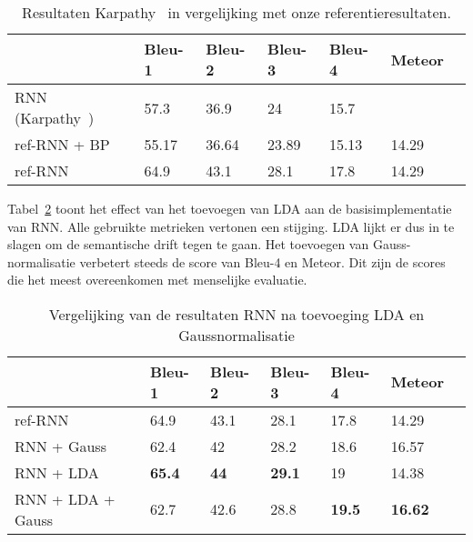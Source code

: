 \begin{table}
	\begin{tabular}{lllllll}
		& Bleu-1 & Bleu-2 & Bleu-3 & Bleu-4 & Meteor \\ \hline
		RNN (Karpathy~\cite{Karpathy2015})    & 57.3   & 36.9   & 24     & 15.7   & ~           \\    
		ref-RNN + BP     & 55.17   & 36.64   & 23.89   & 15.13   & 14.29          \\
		ref-RNN          & 64.9  & 43.1     & 28.1   & 17.8   & 14.29          \\
	\end{tabular}

	\caption{Resultaten Karpathy~\cite{Karpathy2015} in vergelijking met onze referentieresultaten.}
	\label{table:karpathy_met_bp}
\end{table}

Tabel~\ref{table:rnn_met_lda} toont het effect van het toevoegen van LDA aan de basisimplementatie van RNN. Alle gebruikte metrieken vertonen een stijging. LDA lijkt er dus in te slagen om de semantische drift tegen te gaan.
Het toevoegen van Gauss-normalisatie verbetert steeds de score van Bleu-4 en Meteor. Dit zijn de scores die het meest overeenkomen met menselijke evaluatie.

\begin{table}
	\begin{tabular}{lllllll}
		& Bleu-1 & Bleu-2 & Bleu-3 & Bleu-4 & Meteor \\ \hline
		ref-RNN        & 64.9   & 43.1   & 28.1   & 17.8   & 14.29          \\
		RNN + Gauss       & 62.4   & 42     & 28.2   & 18.6   & 16.57          \\
		RNN + LDA         & \textbf{65.4}   & \textbf{44}     & \textbf{29.1}   & 19     & 14.38          \\
		RNN + LDA + Gauss & 62.7   & 42.6   & 28.8   & \textbf{19.5}   & \textbf{16.62}          \\ \hline
	\end{tabular}
	\caption{Vergelijking van de resultaten RNN na toevoeging LDA en Gaussnormalisatie}	
	\label{table:rnn_met_lda}
\end{table}

